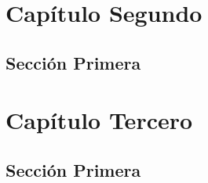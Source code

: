 \documentclass[12pt]{book}
\begin{document}
%



\frontmatter


\mainmatter
\printnoidxglossaries
    

    

    \chapter{Capítulo Segundo}
        \section{Sección Primera}
            \lipsum[9-20]

    \chapter{Capítulo Tercero}
        \section{Sección Primera}
            \lipsum[9-12]

    

    

    
    
    

    
\end{document}
